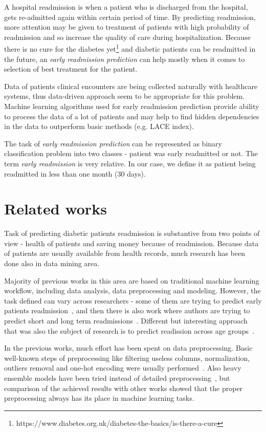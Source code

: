 \documentclass[runningheads]{llncs}
\begin{document}
A hospital readmission is when a patient who is discharged from the hospital, gets re-admitted again within certain period of time. By predicting readmission, more attention may be given to treatment of patients with high probability of readmission and so increase the quality of care during hospitalization. Because there is no cure for the diabetes yet\footnote{https://www.diabetes.org.uk/diabetes-the-basics/is-there-a-cure} and diabetic patients can be readmitted in the future, an \textit{early readmission prediction} can help mostly when it comes to selection of best treatment for the patient.

Data of patients clinical encounters are being collected naturally with healthcare systems, thus data-driven approach seem to be appropriate for this problem. Machine learning algorithms used for early readmission prediction provide ability to process the data of a lot of patients and may help to find hidden dependencies in the data to outperform basic methods (e.g. LACE index).

The task of \textit{early readmission prediction} can be represented as binary classification problem into two classes - patient was early readmitted or not. The term \textit{early readmission} is very relative. In our case, we define it as patient being readmitted in less than one month (30 days).


\section{Related works}

Task of predicting diabetic patients readmission is substantive from two points of view - health of patients and saving money because of readmission. Because data of patients are usually available from health records, much research has been done also in data mining area.

Majority of previous works in this area are based on traditional machine learning workflow, including data analysis, data preprocessing and modeling. However, the task defined can vary across researchers - some of them are trying to predict early patients readmission~\cite{Hammoudeh2018,Sharma2019,Mingle2017}, and then there is also work where authors are trying to predict short and long term readmissions~\cite{Bhuvan2016}. Different but interesting approach that was also the subject of research is to predict readission across age groups~\cite{Mingle2017}.

In the previous works, much effort has been spent on data preprocessing. Basic well-known steps of preprocessing like filtering useless columns, normalization, outliers removal and one-hot encoding were usually performed~\cite{Sharma2019,Mingle2017,Hammoudeh2018,Bhuvan2016}. Also heavy ensemble models have been tried instead of detailed preprocessing~\cite{Mingle2017}, but comparison of the achieved results with other works showed that the proper preprocessing always has its place in machine learning tasks.
\end{document}
